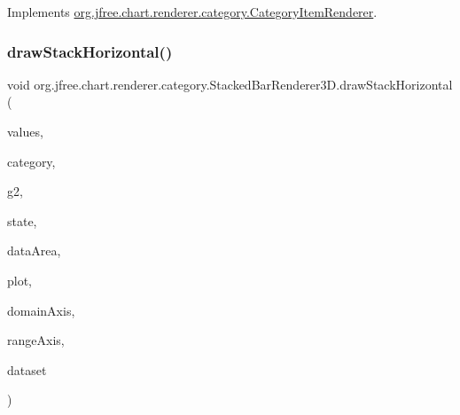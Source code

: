 Implements \mbox{\hyperlink{interfaceorg_1_1jfree_1_1chart_1_1renderer_1_1category_1_1_category_item_renderer_ac18a046a47d2b991ab2c968ce3363aea}{org.\+jfree.\+chart.\+renderer.\+category.\+Category\+Item\+Renderer}}.

\mbox{\label{classorg_1_1jfree_1_1chart_1_1renderer_1_1category_1_1_stacked_bar_renderer3_d_a558fec6208dab132d71e51ab0ef6daa8}} 
\subsubsection{\texorpdfstring{draw\+Stack\+Horizontal()}{drawStackHorizontal()}}
{\footnotesize\ttfamily void org.\+jfree.\+chart.\+renderer.\+category.\+Stacked\+Bar\+Renderer3\+D.\+draw\+Stack\+Horizontal (\begin{DoxyParamCaption}\item[{List}]{values,  }\item[{Comparable}]{category,  }\item[{Graphics2D}]{g2,  }\item[{\mbox{\hyperlink{classorg_1_1jfree_1_1chart_1_1renderer_1_1category_1_1_category_item_renderer_state}{Category\+Item\+Renderer\+State}}}]{state,  }\item[{Rectangle2D}]{data\+Area,  }\item[{\mbox{\hyperlink{classorg_1_1jfree_1_1chart_1_1plot_1_1_category_plot}{Category\+Plot}}}]{plot,  }\item[{\mbox{\hyperlink{classorg_1_1jfree_1_1chart_1_1axis_1_1_category_axis}{Category\+Axis}}}]{domain\+Axis,  }\item[{\mbox{\hyperlink{classorg_1_1jfree_1_1chart_1_1axis_1_1_value_axis}{Value\+Axis}}}]{range\+Axis,  }\item[{\mbox{\hyperlink{interfaceorg_1_1jfree_1_1data_1_1category_1_1_category_dataset}{Category\+Dataset}}}]{dataset }\end{DoxyParamCaption})\hspace{0.3cm}{\ttfamily [protected]}}

